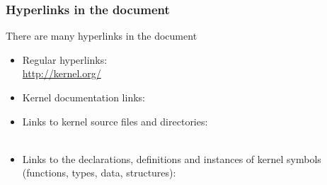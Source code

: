 \begin{frame}
\frametitle{Hyperlinks in the document}
  There are many hyperlinks in the document
  \begin{itemize}
    \item Regular hyperlinks:\\
          \url{http://kernel.org/}
    \item Kernel documentation links:\\
    \item Links to kernel source files and directories:\\
	   \\
    \item Links to the declarations, definitions and instances
          of kernel symbols (functions, types, data, structures): \\
	   \\
	   \\
  \end{itemize}
\end{frame}


